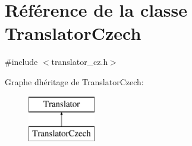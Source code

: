 \hypertarget{class_translator_czech}{}\section{Référence de la classe Translator\+Czech}
\label{class_translator_czech}


{\ttfamily \#include $<$translator\+\_\+cz.\+h$>$}

Graphe d\textquotesingle{}héritage de Translator\+Czech\+:\begin{figure}[H]
\begin{center}
\leavevmode
\includegraphics[height=2.000000cm]{class_translator_czech}
\end{center}
\end{figure}
